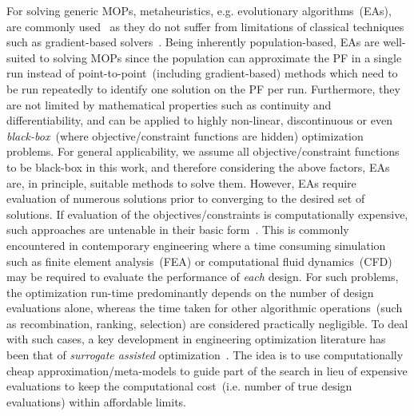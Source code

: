 For solving generic MOPs, metaheuristics, e.g. evolutionary algorithms~(EAs), are commonly used~\cite{deb2001multi} {\color{blue}as they do not suffer from limitations of classical techniques such as gradient-based solvers~\cite{KHTwangreview2007}. Being inherently population-based, EAs are well-suited to solving MOPs since the population can approximate the PF in a single run instead of point-to-point~(including gradient-based) methods which need to be run repeatedly to identify one solution on the PF per run. Furthermore, they are not limited by mathematical properties such as continuity and differentiability, and can be applied to highly non-linear, discontinuous or even \emph{black-box}~(where objective/constraint functions are hidden) optimization problems. For general applicability, we assume all objective/constraint functions to be black-box in this work, and therefore considering the above factors, EAs are, in principle, suitable methods to solve them.} However, EAs require evaluation of numerous solutions prior to converging to the desired set of solutions. If evaluation of the objectives/constraints is computationally expensive, such approaches are untenable  in their basic form~\cite{KHTjmd2016,KHTjin2005csf}. This is commonly encountered in contemporary engineering where a time consuming simulation such as finite element analysis~(FEA) or computational fluid dynamics~(CFD) may be required to evaluate the performance of \emph{each} design. For such problems, the optimization run-time predominantly depends on the number of design evaluations alone, whereas the time taken for other algorithmic operations~(such as recombination, ranking, selection) are considered practically negligible. To deal with such cases, a key development in engineering optimization literature has been that of \textit{surrogate assisted} optimization~\cite{KHTwangreview2007,KHTjinswarm2011}. The idea is to use computationally cheap approximation/meta-models to guide part of the search in lieu of expensive evaluations to keep the computational cost~(i.e. number of true design evaluations) within affordable limits. 


